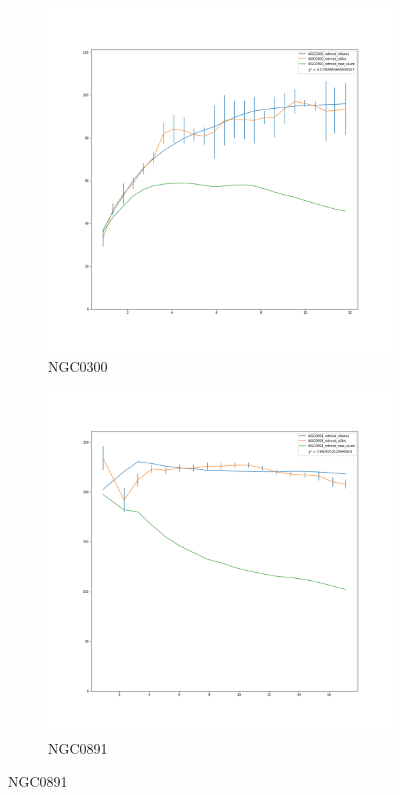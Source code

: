 \documentclass[reprint,%
 amsmath,amssymb,
 aps,
]{revtex4-1}
\begin{document}
\begin{figure}[h]
\begin{subfigure}{.5\textwidth}
  \includegraphics[width=.8\linewidth]{figures/NGC0300_rotmod_XueSofue.png}
  \caption{NGC0300}
  \label{fig:sfig11}
\end{subfigure}%
\begin{subfigure}{.5\textwidth}
  \centering
  \includegraphics[width=.8\linewidth]{figures/NGC0891_rotmod_XueSofue.png}
  \caption{NGC0891}
  \label{fig:sfig12}
\end{subfigure}
\end{figure}
\end{document}
